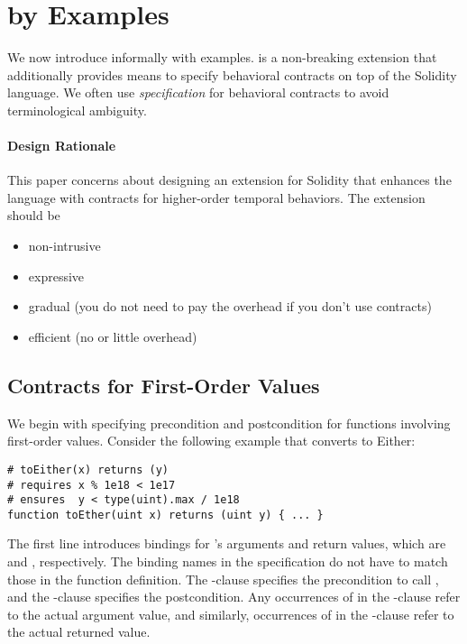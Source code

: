 \section{\lang by Examples}

We now introduce \lang informally with examples.
\lang is a non-breaking extension that additionally provides means
to specify behavioral contracts on top of the Solidity language.
We often use \emph{specification} for behavioral contracts to avoid terminological ambiguity.

\paragraph{Design Rationale}
This paper concerns about designing an extension for Solidity that enhances the
language with contracts for higher-order temporal behaviors.
The extension should be
\begin{itemize}
  \item non-intrusive
  \item expressive
  \item gradual (you do not need to pay the overhead if you don't use contracts)
  \item efficient (no or little overhead)
\end{itemize}

\subsection{Contracts for First-Order Values}

We begin with specifying precondition and postcondition for functions
involving first-order values. Consider the following  example
that converts  to Either:
\begin{lstlisting}[language=Solidity]
# toEither(x) returns (y)
# requires x % 1e18 < 1e17
# ensures  y < type(uint).max / 1e18
function toEther(uint x) returns (uint y) { ... }
\end{lstlisting}

The first line introduces bindings for 's arguments and return
values, which are  and , respectively.
The binding names in the specification do not have to match those in the function definition.
The -clause specifies the precondition to call ,
and the -clause specifies the postcondition.
Any occurrences of  in the -clause refer to the actual
argument value, and similarly, occurrences of  in the -clause
refer to the actual returned value.


